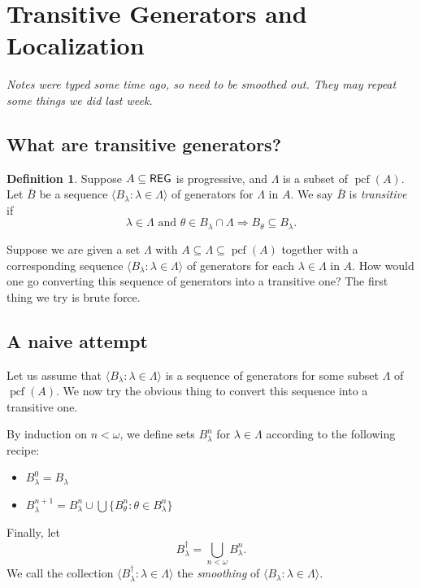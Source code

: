 \documentclass[10pt]{amsart}
\theoremstyle{plain}
\theoremstyle{definition}
\newtheorem{definition}[proposition]{Definition}
\theoremstyle{remark}
\DeclareMathOperator{\pcf}{pcf}
\DeclareMathOperator{\Reg}{{\sf REG}}
\numberwithin{equation}{section}
\begin{document}
\section{Transitive Generators and Localization}

{\em Notes were typed some time ago, so need to be smoothed out.  They may repeat some things we did last week.}

\subsection{What are transitive generators?}
\begin{definition}
Suppose $A\subseteq\Reg$ is progressive, and $\Lambda$ is a subset of $\pcf(A)$.  Let $\bar{B}$ be a sequence $\langle
B_\lambda:\lambda\in\Lambda\rangle$ of generators for $\Lambda$ in $A$.  We say $\bar{B}$ is {\em transitive} if
\begin{equation}
\lambda\in\Lambda\text{ and }\theta\in B_\lambda\cap\Lambda\Longrightarrow B_\theta\subseteq B_\lambda.
\end{equation}
\end{definition}


Suppose we are given a set $\Lambda$ with $A\subseteq\Lambda\subseteq\pcf(A)$ together with a corresponding sequence $\langle
B_\lambda:\lambda\in\Lambda\rangle$ of generators for each $\lambda\in\Lambda$ in $A$. How would one go converting this sequence
of generators into a transitive one?  The first thing we try is brute force.


\subsection{A naive attempt}


Let us assume that $\langle B_\lambda:\lambda\in\Lambda\rangle$ is a sequence of generators for some subset $\Lambda$ of $\pcf(A)$.  We now try the obvious thing to convert this sequence into a transitive one.

By induction on $n<\omega$, we define sets $B^n_\lambda$ for $\lambda\in\Lambda$ according to the following recipe:
\begin{itemize}
\item $B^0_\lambda = B_\lambda$
\item $B^{n+1}_\lambda = B^n_\lambda\cup\bigcup\{B^n_\theta:\theta\in B^n_\lambda\}$
\end{itemize}
Finally, let
\begin{equation}
B^\dagger_\lambda = \bigcup_{n<\omega}B^n_\lambda.
\end{equation}
We call the collection $\langle B^\dagger_\lambda:\lambda\in\Lambda\rangle$ the {\em smoothing} of $\langle
B_\lambda:\lambda\in\Lambda\rangle$.
\end{document}
